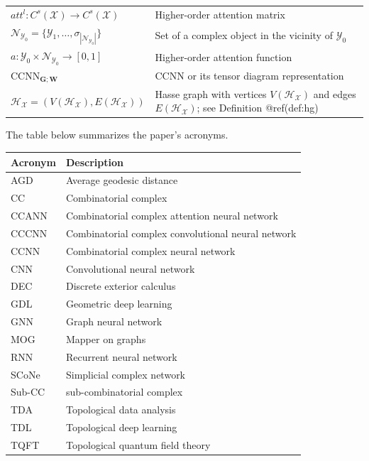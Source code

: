 \documentclass[
  12pt,
]{krantz}
\begin{document}
\begin{longtable}[]{@{}
  >{\raggedright\arraybackslash}p{}
  >{\raggedright\arraybackslash}p{}@{}}
\(att^{l}: C^{s}(\mathcal{X})\to C^{s}(\mathcal{X})\) & Higher-order
attention matrix \\
\(\mathcal{N}_{\mathcal{Y}_0}=\{\mathcal{Y}_1,\ldots,\sigma_{|\mathcal{N}_{\mathcal{Y}_0}|}\}\)
& Set of a complex object in the vicinity of \(\mathcal{Y}_0\) \\
\(a: {\mathcal{Y}_0}\times \mathcal{N}_{\mathcal{Y}_0}\to [0,1]\) &
Higher-order attention function \\
\(\mbox{CCNN}_{\mathbf{G};\mathbf{W}}\) & CCNN or its tensor diagram
representation \\
\(\mathcal{H}_{\mathcal{X}}= (V (\mathcal{H}_{\mathcal{X}}), E(\mathcal{H}_{\mathcal{X}}) )\)
& Hasse graph with vertices \(V (\mathcal{H}_{\mathcal{X}})\) and edges
\(E(\mathcal{H}_{\mathcal{X}})\); see Definition @ref(def:hg) \\
\end{longtable}

The table below summarizes the paper's acronyms.

\begin{longtable}[]{@{}ll@{}}
\toprule\noalign{}
Acronym & Description \\
\midrule\noalign{}
\endhead
\bottomrule\noalign{}
\endlastfoot
AGD & Average geodesic distance \\
CC & Combinatorial complex \\
CCANN & Combinatorial complex attention neural network \\
CCCNN & Combinatorial complex convolutional neural network \\
CCNN & Combinatorial complex neural network \\
CNN & Convolutional neural network \\
DEC & Discrete exterior calculus \\
GDL & Geometric deep learning \\
GNN & Graph neural network \\
MOG & Mapper on graphs \\
RNN & Recurrent neural network \\
SCoNe & Simplicial complex network \\
Sub-CC & sub-combinatorial complex \\
TDA & Topological data analysis \\
TDL & Topological deep learning \\
TQFT & Topological quantum field theory \\
\end{longtable}
\end{document}
